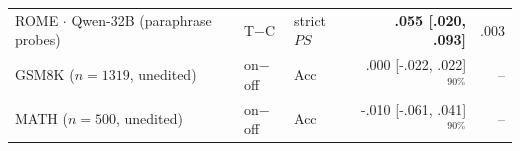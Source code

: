 \documentclass[letterpaper]{article} %
\begin{document}
\begin{table}[t!]
\begin{tabular}{@{}lllrr@{}}
ROME \(\cdot\) Qwen-32B (paraphrase probes) & T$-$C & strict \(PS\) & \textbf{.055 [.020, .093]} & .003\\ %
GSM8K (\(n{=}1319\), unedited) & on$-$off & Acc & .000 [-.022, .022]\(^{90\%}\) & --\\ %
MATH (\(n{=}500\), unedited) & on$-$off & Acc & -.010 [-.061, .041]\(^{90\%}\) & --\\ %
\bottomrule
\end{tabular}

\end{table}
\end{document}
